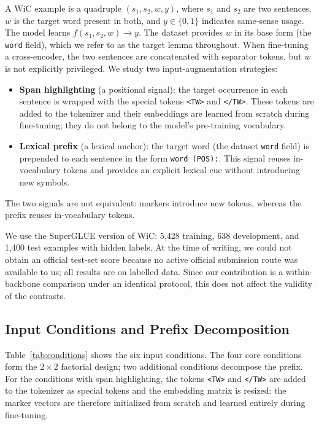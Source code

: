 \documentclass[runningheads]{llncs}
\begin{document}
A WiC example is a quadruple $(s_1, s_2, w, y)$, where $s_1$ and $s_2$ are two
sentences, $w$ is the target word present in both, and $y \in \{0, 1\}$
indicates same-sense usage. The model learns $f(s_1, s_2, w) \rightarrow y$.
The dataset provides $w$ in its base form (the \texttt{word} field), which we
refer to as the target lemma throughout.
When fine-tuning a cross-encoder, the two sentences are concatenated with
separator tokens, but $w$ is not explicitly privileged. We study two
input-augmentation strategies:
\begin{itemize}
\item \textbf{Span highlighting} (a positional signal): the target occurrence in
each sentence is wrapped with the special tokens \texttt{<TW>} and
\texttt{</TW>}. These tokens are added to the tokenizer and their embeddings are
learned from scratch during fine-tuning; they do not belong to the model's
pre-training vocabulary.
\item \textbf{Lexical prefix} (a lexical anchor): the target word (the dataset
\texttt{word} field) is prepended to each sentence in the form \texttt{word (POS):}. This
signal reuses in-vocabulary tokens and provides an explicit lexical cue without
introducing new symbols.
\end{itemize}
The two signals are not equivalent: markers introduce new tokens, whereas the
prefix reuses in-vocabulary tokens.

We use the SuperGLUE version of WiC: 5{,}428 training, 638 development, and
1{,}400 test examples with hidden labels. At the time of writing, we could not obtain
an official test-set score because no active official submission route was
available to us; all results are on labelled data. Since our contribution is a within-backbone comparison
under an identical protocol, this does not affect the validity of the contrasts.

\subsection{Input Conditions and Prefix Decomposition}
\label{subsec:conditions}

Table~\ref{tab:conditions} shows the six input conditions. The four core
conditions form the $2 \times 2$ factorial design; two additional conditions
decompose the prefix. For the conditions with span highlighting, the tokens
\texttt{<TW>} and \texttt{</TW>} are added to the tokenizer as special tokens
and the embedding matrix is resized: the marker vectors are therefore
initialized from scratch and learned entirely during fine-tuning.
\end{document}

